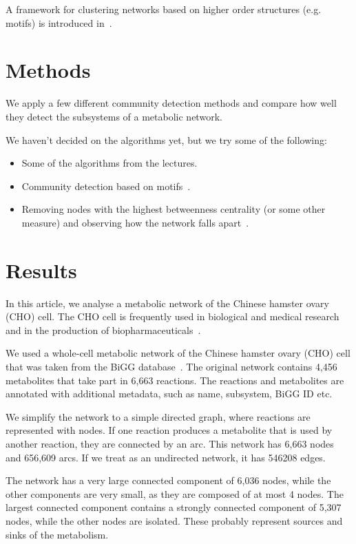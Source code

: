 A framework for clustering networks based on higher order structures (e.g. motifs) is introduced in~\cite{benson2016higher}.

\section{Methods}
\label{sec:methods}

We apply a few different community detection methods and compare how well
they detect the subsystems of a metabolic network.

We haven't decided on the algorithms yet, but we try some of the following:

\begin{itemize}
\item
  Some of the algorithms from the lectures.
\item
  Community detection based on motifs~\cite{benson2016higher}.
\item
  Removing nodes with the highest betweenness centrality (or some other measure)
  and observing how the network falls apart~\cite{holme2003subnetwork}.
\end{itemize}

\section{Results}
\label{sec:results}

In this article, we analyse a metabolic network of the Chinese hamster
ovary (CHO) cell. The CHO cell is frequently used in biological and medical
research and in the production of biopharmaceuticals~\cite{chocons}.

We used a whole-cell metabolic network of the Chinese hamster ovary (CHO)
cell that was taken from the BiGG database~\cite{bigg,chocons}. The original
network contains 4,456 metabolites that take part in 6,663 reactions. The
reactions and metabolites are annotated with additional metadata, such as name,
subsystem, BiGG ID etc.

We simplify the network to a simple directed graph, where reactions are
represented with nodes. If one reaction produces a metabolite that is used by
another reaction, they are connected by an arc. This network has 6,663 nodes and
656,609 arcs. If we treat as an undirected network, it has 546208 edges.

The network has a very large connected component of 6,036 nodes, while the other
components are very small, as they are composed of at most 4 nodes. The largest
connected component contains a strongly connected component of 5,307 nodes,
while the other nodes are isolated. These probably represent sources and sinks
of the metabolism.

